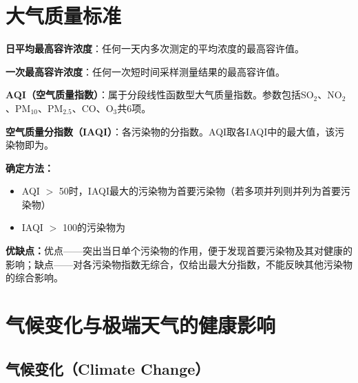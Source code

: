 \section{大气质量标准}

\begin{defbox}
\textbf{日平均最高容许浓度}：任何一天内多次测定的平均浓度的最高容许值。

\textbf{一次最高容许浓度}：任何一次短时间采样测量结果的最高容许值。
\end{defbox}

\begin{tipbox}
\textbf{AQI（空气质量指数）}：属于分段线性函数型大气质量指数。参数包括SO$_2$、NO$_2$、PM$_{10}$、PM$_{2.5}$、CO、O$_3$共6项。

\textbf{空气质量分指数（IAQI）}：各污染物的分指数。AQI取各IAQI中的最大值，该污染物即为。

\textbf{确定方法：}
\begin{itemize}[leftmargin=*]
    \item AQI $>$ 50时，IAQI最大的污染物为首要污染物（若多项并列则并列为首要污染物）
    \item IAQI $>$ 100的污染物为
\end{itemize}

\textbf{优缺点：}优点——突出当日单个污染物的作用，便于发现首要污染物及其对健康的影响；缺点——对各污染物指数无综合，仅给出最大分指数，不能反映其他污染物的综合影响。
\end{tipbox}

\section{气候变化与极端天气的健康影响}

\subsection{气候变化（Climate Change）}

